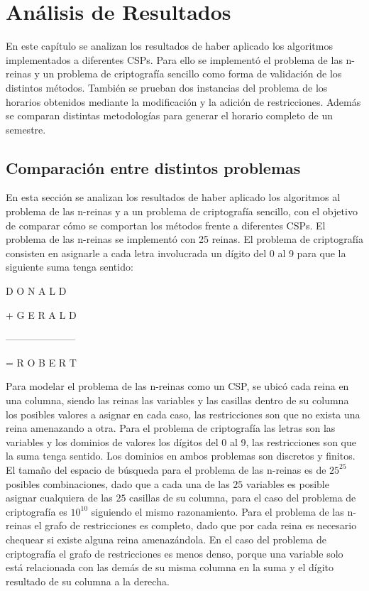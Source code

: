 \chapter{An\'alisis de Resultados}

En este cap\'itulo se analizan los resultados de haber aplicado los algoritmos implementados a diferentes CSPs. Para ello se implement\'o el problema de las n-reinas y un problema de criptograf\'ia sencillo como forma de validaci\'on de los distintos m\'etodos. Tambi\'en se prueban dos instancias del problema de los horarios obtenidos mediante la modificaci\'on y la adici\'on de restricciones. Adem\'as se comparan distintas metodolog\'ias para generar el horario completo de un semestre.

\section{Comparaci\'on entre distintos problemas}

En esta secci\'on se analizan los resultados de haber aplicado los algoritmos al problema de las n-reinas y a un problema de criptograf\'ia sencillo, con el objetivo de comparar c\'omo se comportan los m\'etodos frente a diferentes CSPs. El problema de las n-reinas se implement\'o con 25 reinas. El problema de criptograf\'ia consisten en asignarle a cada letra involucrada un d\'igito del 0 al 9 para que la siguiente suma tenga sentido:

\begin{center}
\quad D O N A L D
	
+ G E R A L D

---------------------

= R O B E R T
\end{center}

Para modelar el problema de las n-reinas como un CSP, se ubic\'o cada reina en una columna, siendo las reinas las variables y las casillas dentro de su columna los posibles valores a asignar en cada caso, las restricciones son que no exista una reina amenazando a otra. Para el problema de criptograf\'ia las letras son las variables y los dominios de valores los d\'igitos del 0 al 9, las restricciones son que la suma tenga sentido. Los dominios en ambos problemas son discretos y finitos. El tamaño del espacio de b\'usqueda para el problema de las n-reinas es de $25^{25}$ posibles combinaciones, dado que a cada una de las $25$ variables es posible asignar cualquiera de las $25$ casillas de su columna, para el caso del problema de criptograf\'ia es $10^{10}$ siguiendo el mismo razonamiento. Para el problema de las n-reinas el grafo de restricciones es completo, dado que por cada reina es necesario chequear si existe alguna reina amenaz\'andola. En el caso del problema de criptograf\'ia el grafo de restricciones es menos denso, porque una variable solo est\'a relacionada con las dem\'as de su misma columna en la suma y el d\'igito resultado de su columna a la derecha.

